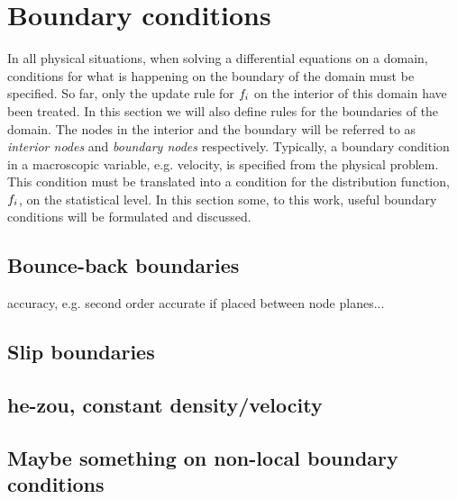 \section{Boundary conditions}\label{sec:lbm:bound}
In all physical situations, when solving a differential equations on a
domain, conditions for what is happening on the boundary of the domain
must be specified. So far, only the update rule for $f_i$ on the
interior of this domain have been treated. In this section we will
also define rules for the boundaries of the domain. The nodes in the
interior and the boundary will be referred to as \emph{interior nodes}
and \emph{boundary nodes} respectively. Typically, a boundary
condition in a macroscopic variable, e.g. velocity, is specified from
the physical problem. This condition must be translated into a
condition for the distribution function, $f_i$, on the statistical
level. In this section some, to this work, useful boundary conditions
will be formulated and discussed.

\subsection{Bounce-back boundaries}\label{sec:lbm:bb}
accuracy, e.g. second order accurate if placed between node planes...

\subsection{Slip boundaries}

\subsection{he-zou, constant density/velocity}

\subsection{Maybe something on non-local boundary conditions}
